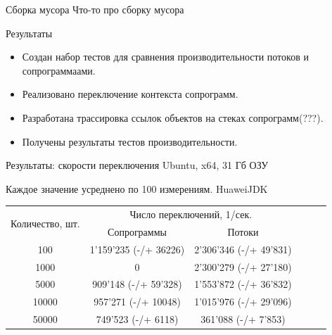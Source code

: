 \begin{frame}{Сборка мусора}
	Что-то про сборку мусора
\end{frame}	
	
\begin{frame}{Результаты}
	\begin{itemize}
	\item Создан набор тестов для сравнения производительности потоков и сопрограммаами.
	\item Реализовано переключение контекста сопрограмм.
	\item Разработана трассировка ссылок объектов на стеках сопрограмм(???).
	\item Получены результаты тестов производительности.
	\end{itemize}
\end{frame}

\begin{frame}{Результаты: скорости переключения}
	Ubuntu, x64, 31 Гб ОЗУ
	\par Каждое значение усреднено по 100 измерениям. HuaweiJDK
	\begin{table}[H]
		\begin{tabular}{|c|c|c|c|c|c|}
			\hline \multirow{2}{*}{Количество, шт.} & \multicolumn{2}{|c|}{Число переключений, 1/сек.}    \\
			\cline{2-3}    & Сопрограммы           & Потоки                  \\%
			\hline 100     & 1'159'235 (-/+ 36226) & 2'306'346 (-/+ 49'831) \\%
			\hline 1000    & 0                     & 2'300'279 (-/+ 27'180)  \\%
			\hline 5000    & 909'148 (-/+ 59'328)  & 1'553'872 (-/+ 36'832)  \\%
			\hline 10000   & 957'271 (-/+ 10048)   & 1'015'976 (-/+ 29'096)               \\%
			\hline 50000   & 749'523 (-/+ 6118)    & 361'088 (-/+ 7'853)     \\%
			\hline 
		\end{tabular}
	\end{table}
	
\end{frame}

